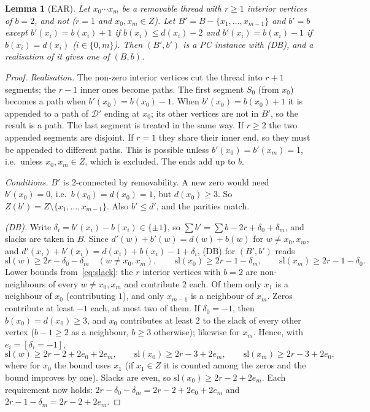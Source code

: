 \documentclass[11pt]{amsart}
\newtheorem{lemma}[theorem]{Lemma}
\theoremstyle{definition}
\begin{document}
\begin{lemma}[EAR]\label{lem:ear}
Let $x_0\cdots x_m$ be a removable thread with $r\ge1$ interior vertices of $b=2$, and not ($r=1$ and
$x_0,x_m\in Z$). Let $B'=B-\{x_1,\dots,x_{m-1}\}$ and $b'=b$ except
$b'(x_i)=b(x_i)+1$ if $b(x_i)\le d(x_i)-2$ and $b'(x_i)=b(x_i)-1$ if $b(x_i)=d(x_i)$ ($i\in\{0,m\}$). Then
$(B',b')$ is a PC instance with (DB), and a realisation of it gives one of $(B,b)$.
\end{lemma}
\begin{proof}
\emph{Realisation.} The non-zero interior vertices cut the thread into $r+1$ segments; the $r-1$ inner
ones become paths. The first segment $S_0$ (from $x_0$) becomes a path when $b'(x_0)=b(x_0)-1$. When
$b'(x_0)=b(x_0)+1$ it is appended to a path of $\mathcal D'$ ending at $x_0$; its other vertices are not in $B'$,
so the result is a path. The last segment is treated in the same way. If $r\ge2$ the two appended segments
are disjoint. If $r=1$ they share their inner end, so they must be appended to different paths. This is
possible unless $b'(x_0)=b'(x_m)=1$, i.e.\ unless $x_0,x_m\in Z$, which is excluded. The ends add up to $b$.

\emph{Conditions.} $B'$ is $2$-connected by removability. A new zero would need $b'(x_0)=0$, i.e.\
$b(x_0)=d(x_0)=1$, but $d(x_0)\ge3$. So $Z(b')=Z\setminus\{x_1,\dots,x_{m-1}\}$. Also $b'\le d'$, and the
parities match.

\emph{(DB).} Write $\delta_i=b'(x_i)-b(x_i)\in\{\pm1\}$, so $\sum b'=\sum b-2r+\delta_0+\delta_m$, and
slacks are taken in $B$. Since $d'(w)+b'(w)=d(w)+b(w)$ for $w\ne x_0,x_m$, and
$d'(x_i)+b'(x_i)=d(x_i)+b(x_i)-1+\delta_i$, (DB) for $(B',b')$ reads
\[
\mathrm{sl}(w)\ge 2r-\delta_0-\delta_m\quad(w\ne x_0,x_m),\qquad
\mathrm{sl}(x_0)\ge 2r-1-\delta_m,\qquad \mathrm{sl}(x_m)\ge 2r-1-\delta_0 .
\]
Lower bounds from~\eqref{eq:slack}: the $r$ interior vertices with $b=2$ are non-neighbours of every
$w\ne x_0,x_m$ and contribute $2$ each. Of them only $x_1$ is a neighbour of $x_0$ (contributing $1$),
and only $x_{m-1}$ is a neighbour of $x_m$. Zeros contribute at least $-1$ each, at most two of them. If
$\delta_0=-1$, then $b(x_0)=d(x_0)\ge3$, and $x_0$ contributes at least $2$ to the slack of every other
vertex ($b-1\ge2$ as a neighbour, $b\ge3$ otherwise); likewise for $x_m$. Hence, with
$e_i=[\delta_i=-1]$,
\[
\mathrm{sl}(w)\ge 2r-2+2e_0+2e_m,\qquad \mathrm{sl}(x_0)\ge 2r-3+2e_m,\qquad
\mathrm{sl}(x_m)\ge 2r-3+2e_0,
\]
where for $x_0$ the bound uses $x_1$ (if $x_1\in Z$ it is counted among the zeros and the bound
improves by one). Slacks are even, so $\mathrm{sl}(x_0)\ge 2r-2+2e_m$. Each requirement now holds:
$2r-\delta_0-\delta_m=2r-2+2e_0+2e_m$ and $2r-1-\delta_m=2r-2+2e_m$.
\end{proof}
\end{document}
